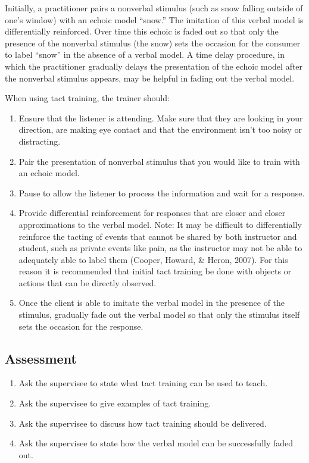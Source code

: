 Initially, a practitioner pairs a nonverbal stimulus (such as snow falling outside of one's window) with an echoic model ``snow.''  The imitation of this verbal model is differentially reinforced.  Over time this echoic is faded out so that only the presence of the nonverbal stimulus (the snow) sets the occasion for the consumer to label ``snow'' in the absence of a verbal model. A time delay procedure, in which the practitioner gradually delays the presentation of the echoic model after the nonverbal stimulus appears, may be helpful in fading out the verbal model.  

When using tact training, the trainer should:
\begin{enumerate}
\item Ensure that the listener is attending.  Make sure that they are looking in your direction, are making eye contact and that the environment isn't too noisy or distracting.
\item Pair the presentation of nonverbal stimulus that you would like to train with an echoic model.  
\item Pause to allow the listener to process the information and wait for a response.
\item Provide differential reinforcement for responses that are closer and closer approximations to the verbal model. Note:  It may be difficult to differentially reinforce the tacting of events that cannot be shared by both instructor and student, such as private events like pain, as the instructor may not be able to adequately able to label them (Cooper, Howard, \& Heron, 2007).  For this reason it is recommended that initial tact training be done with objects or actions that can be directly observed.
\item Once the client is able to imitate the verbal model in the presence of the stimulus, gradually fade out the verbal model so that only the stimulus itself sets the occasion for the response. 
\end{enumerate}
%
\subsection{Assessment}
\begin{enumerate}
\item Ask the supervisee to state what tact training can be used to teach.
\item Ask the supervisee to give examples of tact training.
\item Ask the supervisee to discuss how tact training should be delivered.
\item Ask the supervisee to state how the verbal model can be successfully faded out.
\end{enumerate}
%
